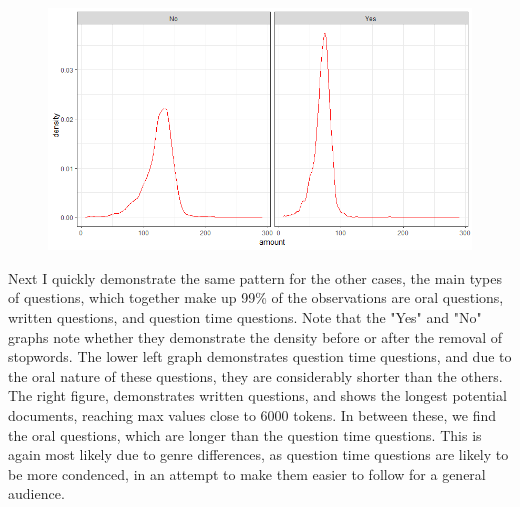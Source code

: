 \documentclass[12pt]{article}
\begin{document}
	\begin{figure}[h]
		\includegraphics[scale=0.60]{Img/preposttreatedinterpell.png}
	\end{figure}
	
	Next I quickly demonstrate the same pattern for the other cases, the main types of questions, which together make up 99\% of the observations are oral questions, written questions, and question time questions. Note that the "Yes" and "No" graphs note whether they demonstrate the density before or after the removal of stopwords. The lower left graph demonstrates question time questions, and due to the oral nature of these questions, they are considerably shorter than the others. The right figure, demonstrates written questions, and shows the longest potential documents, reaching max values close to 6000 tokens. In between these, we find the oral questions, which are longer than the question time questions. This is again most likely due to genre differences, as question time questions are likely to be more condenced, in an attempt to make them easier to follow for a general audience.
	
\end{document}
